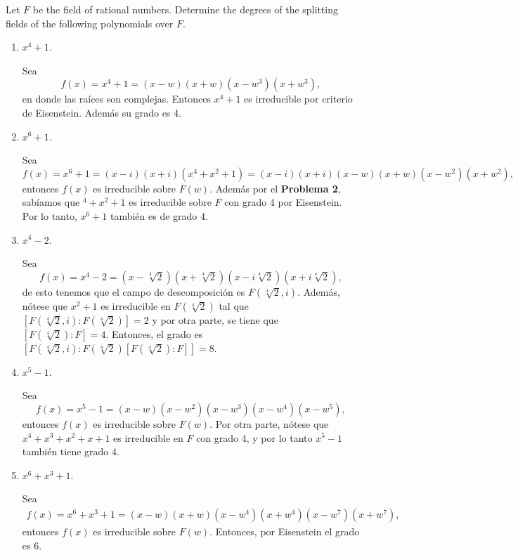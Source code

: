 \begin{problema}[Problema 6]
    Let $F$ be the field of rational numbers. Determine the degrees of the splitting fields of the following polynomials over $F$.
    \begin{enumerate}
        \item $x^4+1$.
        \begin{dem}
            Sea 
            $$f(x)=x^4+1=(x-w)(x+w)(x-w^3)(x+w^3),$$
            en donde las raíces son complejas. Entonces $x^4+1$ es irreducible por criterio de Eisenstein. Además su grado es 4. 
        \end{dem}
        \item $x^6+1$.
        \begin{dem}
            Sea 
            $$f(x)=x^6+1=(x-i)(x+i)(x^4+x^2+1)=(x-i)(x+i)(x-w)(x+w)(x-w^2)(x+w^2),$$
            entonces $f(x)$ es irreducible sobre $F(w)$. Además por el \textbf{Problema 2}, sabíamos que $^4+x^2+1$ es irreducible sobre $F$ con grado 4 por Eisenstein. Por lo tanto, $x^6+1$ también es de grado 4. 
        \end{dem}
        \item $x^4-2$.
        \begin{dem}
            Sea
            $$f(x)=x^4-2 = (x-\sqrt[4]{2})(x+\sqrt[4]{2})(x-i\sqrt[4]{2})(x+i\sqrt[4]{2}),$$
            de esto tenemos que el campo de descomposición es $F(\sqrt[4]{2},i)$. Además, nótese que $x^2+1$ es irreducible en $F(\sqrt[4]{2})$ tal que $[F(\sqrt[4]{2},i):F(\sqrt[4]{2})]=2$ y por otra parte, se tiene que $[F(\sqrt[4]{2}):F]=4$. Entonces, el grado es $[F(\sqrt[4]{2},i):F(\sqrt[4]{2})[F(\sqrt[4]{2}):F]]=8$.
        \end{dem}
        \item $x^5-1$.
        \begin{dem}
            Sea
            $$f(x)=x^5-1=(x-w)(x-w^2)(x-w^3)(x-w^4)(x-w^5),$$
            entonces $f(x)$ es irreducible sobre $F(w)$. Por otra parte, nótese que $x^4+x^3+x^2+x+1$ es irreducible en $F$ con grado 4, y por lo tanto $x^5-1$ también tiene grado 4. 
        \end{dem}
        \item $x^6+x^3+1$.
        \begin{dem}
            Sea
            \begin{align*}
                f(x)=x^6+x^3+1 =(x-w)(x+w)(x-w^4)(x+w^4)(x-w^7)(x+w^7),
            \end{align*}
            entonces $f(x)$ es irreducible sobre $F(w)$. Entonces, por Eisenstein el grado es 6. 
        \end{dem} 
    \end{enumerate}

\end{problema}

